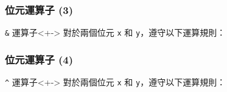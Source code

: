 \documentclass[utf8]{beamer}
\begin{document}
\begin{CJK}{UTF8}{bkai}
\begin{frame}[fragile]
  \frametitle{位元運算子 (3)}
  \begin{block}{\lstinline{&}{} 運算子}<+->
    對於兩個位元 \lstinline{x}{} 和 \lstinline{y}{}，遵守以下運算規則：
  \end{block}
\end{frame}

\begin{frame}[fragile]
  \frametitle{位元運算子 (4)}
  \begin{block}{\lstinline{^}{} 運算子}<+->
    對於兩個位元 \lstinline{x}{} 和 \lstinline{y}{}，遵守以下運算規則：
  \end{block}
  \
\end{frame}


\end{CJK}
\end{document}
